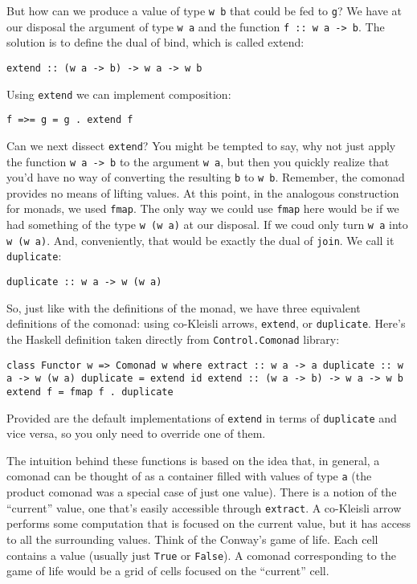 But how can we produce a value of type \texttt{w\ b} that could be fed
to \texttt{g}? We have at our disposal the argument of type
\texttt{w\ a} and the function \texttt{f\ ::\ w\ a\ -\textgreater{}\ b}.
The solution is to define the dual of bind, which is called extend:

\begin{verbatim}
extend :: (w a -> b) -> w a -> w b
\end{verbatim}

Using \texttt{extend} we can implement composition:

\begin{verbatim}
f =>= g = g . extend f
\end{verbatim}

Can we next dissect \texttt{extend}? You might be tempted to say, why
not just apply the function \texttt{w\ a\ -\textgreater{}\ b} to the
argument \texttt{w\ a}, but then you quickly realize that you'd have no
way of converting the resulting \texttt{b} to \texttt{w\ b}. Remember,
the comonad provides no means of lifting values. At this point, in the
analogous construction for monads, we used \texttt{fmap}. The only way
we could use \texttt{fmap} here would be if we had something of the type
\texttt{w\ (w\ a)} at our disposal. If we coud only turn \texttt{w\ a}
into \texttt{w\ (w\ a)}. And, conveniently, that would be exactly the
dual of \texttt{join}. We call it \texttt{duplicate}:

\begin{verbatim}
duplicate :: w a -> w (w a)
\end{verbatim}

So, just like with the definitions of the monad, we have three
equivalent definitions of the comonad: using co-Kleisli arrows,
\texttt{extend}, or \texttt{duplicate}. Here's the Haskell definition
taken directly from \texttt{Control.Comonad} library:

\begin{verbatim}
class Functor w => Comonad w where extract :: w a -> a duplicate :: w a -> w (w a) duplicate = extend id extend :: (w a -> b) -> w a -> w b extend f = fmap f . duplicate
\end{verbatim}

Provided are the default implementations of \texttt{extend} in terms of
\texttt{duplicate} and vice versa, so you only need to override one of
them.

The intuition behind these functions is based on the idea that, in
general, a comonad can be thought of as a container filled with values
of type \texttt{a} (the product comonad was a special case of just one
value). There is a notion of the ``current'' value, one that's easily
accessible through \texttt{extract}. A co-Kleisli arrow performs some
computation that is focused on the current value, but it has access to
all the surrounding values. Think of the Conway's game of life. Each
cell contains a value (usually just \texttt{True} or \texttt{False}). A
comonad corresponding to the game of life would be a grid of cells
focused on the ``current'' cell.

